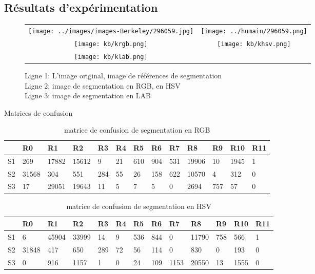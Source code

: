 \documentclass[article=a4, fontsize=11pt]{scrartcl}	%
\begin{document}
\subsection{Résultats d'expérimentation}

\clearpage
\begin{figure}[!ht]
	\begin{center}
		\begin{tabular}[h]{cc}
			\texttt{[image: ../images/images-Berkeley/296059.jpg]}&
			\texttt{[image: ../humain/296059.png]}\\
						
			\texttt{[image: kb/krgb.png]}&
			\texttt{[image: kb/khsv.png]}\\
			\texttt{[image: kb/klab.png]}& 
		\end{tabular}
	\end{center}
	\caption{Ligne 1: L'image original, image de références de segmentation\\
			 Ligne 2: image de segmentation en RGB, en HSV \\
			 Ligne 3: image de segmentation en LAB}	
\end{figure}
\clearpage
\Huge {Matrices de confusion}\normalsize
\begin{table}[!ht]
	\begin{center}
	    \begin{tabular}{| l | l | l | l | l | l | l | l | l | l | l | l | l |  }
	    	\hline
	    	  & R0 & R1 & R2 & R3 & R4 & R5 & R6 & R7 & R8 & R9 & R10 & R11\\
	    	\hline
	    	S1 & 269 & 17882 & 15612 & 9 & 21 & 610 & 904 & 531  & 19906 & 10 & 1945 & 1 \\
	    	\hline
	    	S2 & 31568 & 304 & 551 & 284 & 55 & 26 & 158 & 622 & 10570 & 4 & 312 & 0 \\
	    	\hline
	    	S3 & 17 & 29051 & 19643 & 11 & 5  & 7 & 5 & 0 & 2694 & 757 & 57 & 0 \\
	    	\hline
	    \end{tabular}
	\end{center}
	\caption {matrice de confusion de segmentation en RGB}
\end{table}

\begin{table}[!ht]
	\begin{center}
	    \begin{tabular}{| l | l | l | l | l | l | l | l | l | l | l | l | l |  }
	    	\hline
	    	  & R0 & R1 & R2 & R3 & R4 & R5 & R6 & R7 & R8 & R9 & R10 & R11\\
	    	\hline
	    	S1 & 6 & 45904 & 33999 & 14 & 9 & 536 & 844 & 0  & 11790 & 758 & 566 & 1 \\
	    	\hline
	    	S2 & 31848 & 417 & 650 & 289 & 72 & 56 & 114 & 0 & 830 & 0 & 193 & 0 \\
	    	\hline
	    	S3 & 0 & 916 & 1157 & 1 & 0  & 24 & 109 & 1153 & 20550 & 13 & 1555 & 0 \\
	    	\hline
	    \end{tabular}
	\end{center}
	\caption {matrice de confusion de segmentation en HSV}
\end{table}
\end{document}
